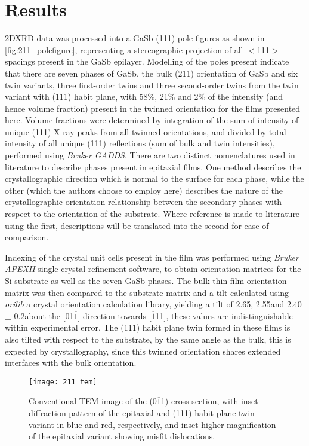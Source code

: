 \section{Results}
2DXRD data was processed into a GaSb (111) pole figures as shown in \cref{fig:211_polefigure}, representing a stereographic projection of all $<$111$>$ spacings present in the GaSb epilayer. Modelling of the poles present indicate that there are seven phases of GaSb, the bulk (211) orientation of GaSb and six twin variants, three first-order twins and three second-order twins from the twin variant with (111) habit plane, with 58\%, 21\% and 2\% of the intensity (and hence volume fraction) present in the twinned orientation for the films presented here. Volume fractions were determined by integration of the sum of intensity of unique (111) X-ray peaks from all twinned orientations, and divided by total intensity of all unique (111) reflections (sum of bulk and twin intensities), performed using \textit{Bruker GADDS}. There are two distinct nomenclatures used in literature to describe phases present in epitaxial films.\cite{Kim2010a,Lange1991,Johnson2011,DeLyon1995} One method describes the crystallographic direction which is normal to the surface for each phase, while the other (which the authors choose to employ here) describes the nature of the crystallographic orientation relationship between the secondary phases with respect to the orientation of the substrate. Where reference is made to literature using the first, descriptions will be translated into the second for ease of comparison.

Indexing of the crystal unit cells present in the film was performed using \textit{Bruker APEXII} single crystal refinement software, to obtain orientation matrices for the Si substrate as well as the seven GaSb phases. The bulk thin film orientation matrix was then compared to the substrate matrix and a tilt calculated using \textit{orilib} a crystal orientation calculation library, yielding a tilt of 2.65\degree, 2.55\degree and 2.40\degree $\pm$ 0.2\degree about the [01$\overline{1}$] direction towards [$\overline{1}$11], these values are indistinguishable within experimental error. The (111) habit plane twin formed in these films is also tilted with respect to the substrate, by the same angle as the bulk, this is expected by crystallography, since this twinned orientation shares extended interfaces with the bulk orientation.
\begin{figure}
    \centering
\texttt{[image: 211\_tem]}
\caption[TEM of thin film on 211 silicon]{\label{fig:211_tem}Conventional TEM image of the (0$\overline{1}$1) cross section, with inset diffraction pattern of the epitaxial and (111) habit plane twin variant in blue and red, respectively, and inset higher-magnification of the epitaxial variant showing misfit dislocations.}
\end{figure}


